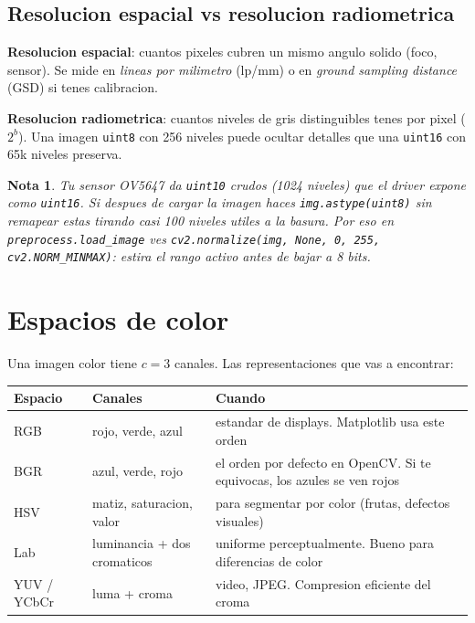 \documentclass[11pt,a4paper,twoside,openright]{book}
\newtheorem*{nota}{Nota}
\begin{document}
\subsection{Resolucion espacial vs resolucion radiometrica}

\textbf{Resolucion espacial}: cuantos pixeles cubren un mismo angulo solido (foco, sensor). Se mide en \emph{lineas por milimetro} (lp/mm) o en \emph{ground sampling distance} (GSD) si tenes calibracion.

\textbf{Resolucion radiometrica}: cuantos niveles de gris distinguibles tenes por pixel ($2^b$). Una imagen \texttt{uint8} con 256 niveles puede ocultar detalles que una \texttt{uint16} con 65k niveles preserva.

\begin{nota}
Tu sensor OV5647 da \texttt{uint10} crudos (1024 niveles) que el driver expone como \texttt{uint16}. Si despues de cargar la imagen haces \texttt{img.astype(uint8)} sin remapear estas tirando casi 100 niveles utiles a la basura. Por eso en \texttt{preprocess.load\_image} ves \texttt{cv2.normalize(img, None, 0, 255, cv2.NORM\_MINMAX)}: estira el rango activo antes de bajar a 8 bits.
\end{nota}

\section{Espacios de color}

Una imagen color tiene $c=3$ canales. Las representaciones que vas a encontrar:

\begin{center}
\begin{tabular}{@{}p{3cm}p{4cm}p{6.5cm}@{}}
\toprule
\textbf{Espacio} & \textbf{Canales} & \textbf{Cuando} \\
\midrule
RGB & rojo, verde, azul & estandar de displays. Matplotlib usa este orden \\
BGR & azul, verde, rojo & el orden por defecto en OpenCV. Si te equivocas, los azules se ven rojos \\
HSV & matiz, saturacion, valor & para segmentar por color (frutas, defectos visuales) \\
Lab & luminancia + dos cromaticos & uniforme perceptualmente. Bueno para diferencias de color \\
YUV / YCbCr & luma + croma & video, JPEG. Compresion eficiente del croma \\
\bottomrule
\end{tabular}
\end{center}
\end{document}
